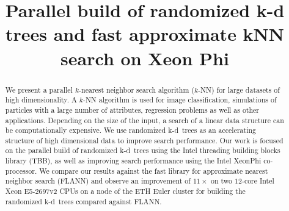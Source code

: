 \documentclass[letterpaper]{article}
\title{Parallel build of randomized k-d trees and fast approximate kNN search on Xeon Phi}
\begin{document}
\maketitle

\begin{abstract}
  We present a parallel $k$-nearest neighbor search algorithm ($k$-NN) for 
  large datasets of high dimensionality.  A $k$-NN algorithm is used for image 
  classification, simulations of particles with a large number of attributes, 
  regression problems as well as other applications.  Depending on the size of 
  the input, a search of a linear data structure can be computationally 
  expensive.  We use randomized k-d~trees as an accelerating structure of high 
  dimensional data to improve search performance.   Our work is focused on the 
  parallel build of randomized k-d~trees using the Intel threading building 
  blocks library (TBB), as well as improving search performance using the Intel 
  XeonPhi co-processor.  We compare our results against the fast library for 
  approximate nearest neighbor search (FLANN) and observe an improvement of 
  $11\times$ on two $12$-core Intel Xeon E5-2697v2 CPUs on a node of the ETH 
  Euler cluster for building the randomized k-d~trees compared against FLANN.  


  \end{abstract}

  
  
  
  
  

  
  
\end{document}
